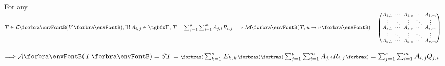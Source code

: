 For any $T\in\Lm{V},\exists\,!\,A_{i,\;\!j}\in{}\Fbb,\,T=\textstyle\sum_{j=1}^p\sum_{i=1}^m A_{j,\;\!i}R_{i,\;\!j}\Longrightarrow\Mt{T,u\rightarrow v}={\small\begin{pmatrix}
		A_{1,1} &\hspace{-6pt} \cdots &\hspace{-6pt} A_{1,\;\!s} &\hspace{-6pt} \cdots &\hspace{-6pt} A_{1,\;\!m}\\[-2pt]
		\vdots  &\hspace{-6pt} \ddots &\hspace{-6pt} \vdots  &\hspace{-6pt} \ddots &\hspace{-6pt} \vdots\\[-4pt]
		A_{s,1} &\hspace{-6pt} \cdots &\hspace{-6pt} A_{s,\;\!s} &\hspace{-6pt} \cdots &\hspace{-6pt} A_{s,\;\!m}\\[-2pt]
		\vdots  &\hspace{-6pt} \ddots &\hspace{-6pt} \vdots  &\hspace{-6pt} \ddots &\hspace{-6pt} \vdots\\[-4pt]
		A_{p,1} &\hspace{-6pt} \cdots &\hspace{-6pt} A_{p,\;\!s} &\hspace{-6pt} \cdots &\hspace{-6pt} A_{p,\;\!m}
\end{pmatrix}}$\par\vspace{-20pt}\quad
$\Longrightarrow\mA\Par{T}=ST=\textstyle\XPar{{\sum_{k=1}^sE_{k,\;\!k}}}\XPar{{\textstyle\sum_{j=1}^p\sum_{i=1}^m A_{j,\;\!i}R_{i,\;\!j}}}=\textstyle\sum_{j=1}^s\sum_{i=1}^m A_{i,\;\!j}Q_{j,\;\!i}.$\par\hspace{0pt}

